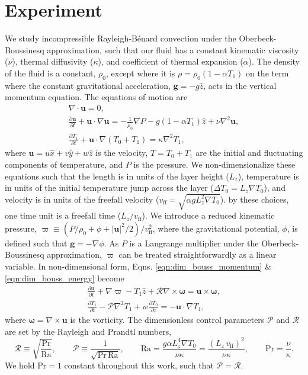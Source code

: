\documentclass[aps, pre, onecolumn, nofootinbib, notitlepage, groupedaddress, amsfonts, amssymb, amsmath, longbibliography]{revtex4-1}
\newcommand{\DivU}{\ensuremath{\nabla\cdot\bm{u}}}
\newcommand{\grad}{\ensuremath{\nabla}}
\newcommand{\RB}{Rayleigh-B\'{e}nard }
\begin{document}
\section{Experiment}
\label{sec:experiment}
We study incompressible \RB convection under the Oberbeck-Boussinesq approximation,
such that our fluid
has a constant kinematic viscosity ($\nu$), thermal diffusivity ($\kappa$), and coefficient
of thermal expansion ($\alpha$). The density of the fluid is a constant, $\rho_0$,
except where it is $\rho = \rho_0(1  - \alpha T_1)$ on the term where
the constant gravitational acceleration, $\bm{g} = - g\hat{z}$, 
acts in the vertical momentum equation.
The equations of motion are \cite{spiegel&veronis1960}
\begin{gather}
\DivU = 0, 
	\label{eqn:incompressible}
\\
\frac{\partial \bm{u}}{\partial t} + \bm{u}\cdot\grad\bm{u} =
-\frac{1}{\rho_0}\grad P - g( 1 - \alpha T_1)\hat{z} + \nu\grad^2\bm{u}, 
	\label{eqn:dim_bouss_momentum}
\\
\frac{\partial T_1}{\partial t} + \bm{u}\cdot\grad(T_0 + T_1) = \kappa\grad^2 T_1,
	\label{eqn:dim_bouss_energy}
\end{gather}
where $\bm{u} = u\hat{x} + v\hat{y} + w\hat{z}$ is the velocity, 
$T = T_0 + T_1$ are the initial and fluctuating components of temperature, 
and $P$ is the pressure.
We non-dimensionalize these equations such that the
length is in units of the layer height ($L_z$),
temperature is in units of the initial temperature jump across the layer ($\Delta T_0 = L_z \grad T_0$), 
and velocity is in units of the freefall velocity ($v_{\text{ff}} = \sqrt{\alpha g L_z^2 \grad T_0}$).
by these choices, one time unit is a freefall time ($L_z/v_{\text{ff}}$).
We introduce a reduced kinematic pressure,
$\varpi \equiv (P / \rho_0 + \phi + |\bm{u}|^2 / 2) / v_{\text{ff}}^2$, where the gravitational
potential, $\phi$, is defined such that $\bm{g} = -\grad \phi$. As $P$ is a
Langrange multiplier under the Oberbeck-Boussinesq approximation, $\varpi$
can be treated straightforwardly as a linear variable. 
In non-dimensional form, Eqns. \ref{eqn:dim_bouss_momentum} \& \ref{eqn:dim_bouss_energy}
become
\begin{gather}
\frac{\partial \bm{u}}{\partial t} + \grad \varpi - T_1\hat{z} + \mathcal{R}\grad\times\bm{\omega} = \bm{u}\times\bm{\omega},
	\label{eqn:bouss_momentum}
\\
\frac{\partial T_1}{\partial t} - \mathcal{P}\grad^2 T_1 + w \frac{\partial T_0}{\partial z} = - \bm{u}\cdot\grad T_1,
	\label{eqn:bouss_energy}
\end{gather}
where $\bm{\omega} = \grad \times \bm{u}$ is the vorticity.
The dimensionless control parameters $\mathcal{P}$ and $\mathcal{R}$ 
are set by the Rayleigh and Prandtl numbers,
\begin{equation}
\mathcal{R} \equiv \sqrt{\frac{\text{Pr}}{\text{Ra}}}, \qquad \mathcal{P} \equiv \frac{1}{\sqrt{\text{Pr}\,\text{Ra}}}, \qquad
\text{Ra} = \frac{g \alpha L_z^4 \grad T_0}{\nu\kappa} = \frac{(L_z\,v_{\text{ff}})^2}{\nu\kappa}, \qquad \text{Pr} = \frac{\nu}{\kappa}.
\end{equation}
We hold Pr$ = 1$ constant throughout this work, such that $\mathcal{P} = \mathcal{R}$.
\end{document}

